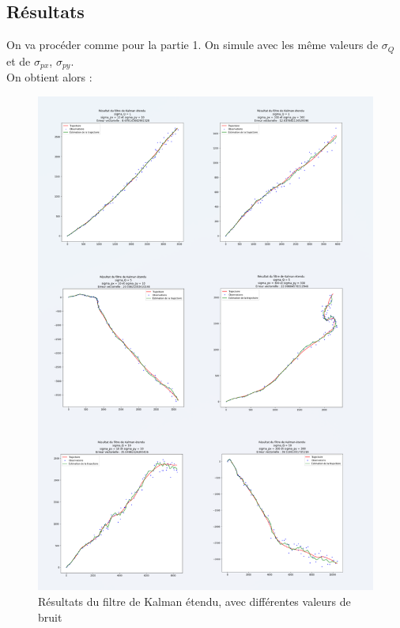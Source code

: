 \subsection{Résultats}
On va procéder comme pour la partie 1. On simule avec les même valeurs de $\sigma_{Q}$ et de $\sigma_{px}$, $\sigma_{py}$.\\
On obtient alors :
\begin{figure}[hbt!]
	\centering
	\includegraphics[scale=1]{./images/ee.png}
	\caption{\centering Résultats du filtre de Kalman étendu, avec différentes valeurs de bruit}
\end{figure}
\FloatBarrier


